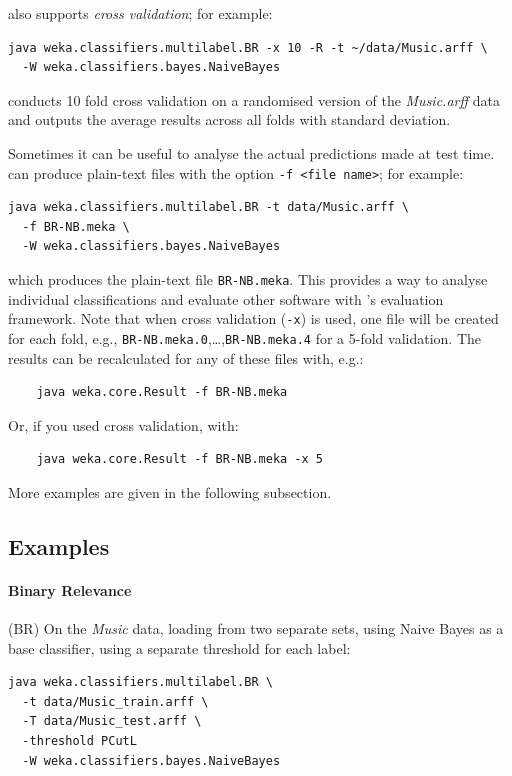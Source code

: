 \documentclass[11pt]{article}
\newcommand{\MEKA}{Meka}
\begin{document}
\framework{\MEKA} also supports \emph{cross validation}; for example:
\begin{verbatim}
java weka.classifiers.multilabel.BR -x 10 -R -t ~/data/Music.arff \
  -W weka.classifiers.bayes.NaiveBayes
\end{verbatim}
conducts 10 fold cross validation on a randomised version of the \textit{Music.arff} data and outputs the average results across all folds with standard deviation. %

Sometimes it can be useful to analyse the actual predictions made at test time. \framework{\MEKA} can produce plain-text files with the option \texttt{-f <file name>}; for example:
\begin{verbatim}
java weka.classifiers.multilabel.BR -t data/Music.arff \ 
  -f BR-NB.meka \
  -W weka.classifiers.bayes.NaiveBayes
\end{verbatim}
which produces the plain-text file \texttt{BR-NB.meka}. This provides a way to analyse individual classifications and evaluate other software with \framework{\MEKA}'s evaluation framework. Note that when cross validation (\texttt{-x}) is used, one file will be created for each fold, e.g., \texttt{BR-NB.meka.0},\ldots,\texttt{BR-NB.meka.4} for a 5-fold validation. The results can be recalculated for any of these files with, e.g.:
\begin{verbatim}
	java weka.core.Result -f BR-NB.meka
\end{verbatim}
Or, if you used cross validation, with:
\begin{verbatim}
	java weka.core.Result -f BR-NB.meka -x 5
\end{verbatim}

More examples are given in the following subsection.

\subsection{Examples} 



\paragraph{Binary Relevance} (BR) On the \textit{Music} data, loading from two separate sets, using Naive Bayes as a base classifier, using a separate threshold for each label: 
\begin{verbatim}
java weka.classifiers.multilabel.BR \
  -t data/Music_train.arff \
  -T data/Music_test.arff \
  -threshold PCutL
  -W weka.classifiers.bayes.NaiveBayes
\end{verbatim}
\end{document}

